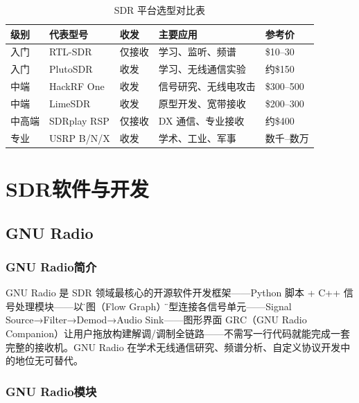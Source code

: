 \documentclass[12pt,UTF8]{ctexbook}
\begin{document}
\begin{table}[htbp]
	\centering
	\caption{SDR 平台选型对比表}
	\label{tab:sdr_selection}
	\begin{tabular}{@{}lllp{4cm}l@{}}
		\toprule
		\textbf{级别} & \textbf{代表型号} & \textbf{收发} & \textbf{主要应用} & \textbf{参考价} \\
		\midrule
		入门   & RTL-SDR    & 仅接收 & 学习、监听、频谱       & \$10--30 \\
		入门   & PlutoSDR   & 收发   & 学习、无线通信实验     & 约\$150 \\
		中端   & HackRF One & 收发   & 信号研究、无线电攻击   & \$300--500 \\
		中端   & LimeSDR    & 收发   & 原型开发、宽带接收     & \$200--300 \\
		中高端 & SDRplay RSP & 仅接收 & DX 通信、专业接收      & 约\$400 \\
		专业   & USRP B/N/X  & 收发   & 学术、工业、军事       & 数千--数万 \\
		\bottomrule
	\end{tabular}
\end{table}

\chapter{SDR软件与开发}
\label{chap:sdr_software}

\section{GNU Radio}
\label{sec:gnuradio}

\subsection{GNU Radio简介}

GNU Radio 是 SDR 领域最核心的开源软件开发框架——Python 脚本 + C++ 信号处理模块——以\"流图（Flow Graph）\"模型连接各信号单元——Signal Source→Filter→Demod→Audio Sink——图形界面 GRC（GNU Radio Companion）让用户拖放构建解调/调制全链路——不需写一行代码就能完成一套完整的接收机。GNU Radio 在学术无线通信研究、频谱分析、自定义协议开发中的地位无可替代。

\subsection{GNU Radio模块}
\end{document}
